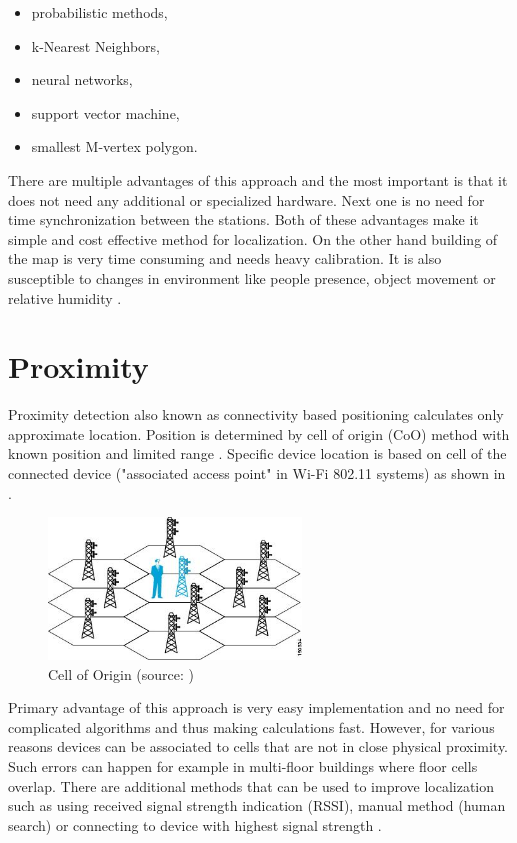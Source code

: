 \begin{itemize}
	\item probabilistic methods,
	\item k-Nearest Neighbors,
	\item neural networks,
	\item support vector machine,
	\item smallest M-vertex polygon.
\end{itemize}

There are multiple advantages of this approach and the most important is that it does not need any additional or specialized hardware. Next one is no need for time synchronization between the stations. Both of these advantages make it simple and cost effective method for localization. On the other hand building of the map is very time consuming and needs heavy calibration. It is also susceptible to changes in environment like people presence, object movement or relative humidity \cite{IILUBLEB}\cite{RSSFofIFD}.

\section{Proximity}\label{sec:Proximity}
Proximity detection also known as connectivity based positioning calculates only approximate location. Position is determined by cell of origin (CoO) method with known position and limited range \cite{RAinWILTaS}. Specific device location is based on cell of the connected device ("associated access point" in Wi-Fi 802.11 systems) as shown in  \cite{WiFiLBS}.

\begin{figure}[h!]
	\begin{centering}
		\includegraphics[width=0.6\textwidth]{img/cell_of_origin}
		\par\end{centering}
	\caption{Cell of Origin (source: \cite{WiFiLBS})\label{fig:CellOfOrigin}}
	\label{fig5}
\end{figure}

Primary advantage of this approach is very easy implementation and no need for complicated algorithms and thus making calculations fast. However, for various reasons devices can be associated to cells that are not in close physical proximity. Such errors can happen for example in multi-floor buildings where floor cells overlap. There are additional methods that can be used to improve localization such as using received signal strength indication (RSSI), manual method (human search) or connecting to device with highest signal strength \cite{WiFiLBS}\cite{RAinWILTaS}.

